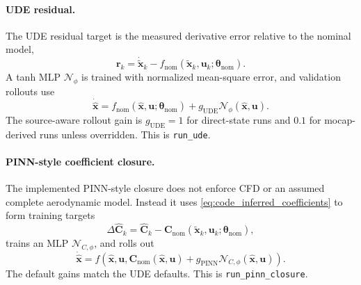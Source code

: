 \documentclass[11pt]{article}
\begin{document}
\paragraph{UDE residual.}
The UDE residual target is the measured derivative error relative to the
nominal model,
\begin{equation}
    \mathbf{r}_k
    =
    \dot{\widetilde{\mathbf{x}}}_k
    -
    f_{\mathrm{nom}}(\widetilde{\mathbf{x}}_k,\mathbf{u}_k;
    \boldsymbol{\theta}_{\mathrm{nom}}).
\end{equation}
A tanh MLP $\mathcal{N}_\phi$ is trained with normalized mean-square error, and
validation rollouts use
\begin{equation}
    \dot{\hat{\mathbf{x}}}
    =
    f_{\mathrm{nom}}(\hat{\mathbf{x}},\mathbf{u};
    \boldsymbol{\theta}_{\mathrm{nom}})
    +g_{\mathrm{UDE}}\mathcal{N}_\phi(\hat{\mathbf{x}},\mathbf{u}).
    \label{eq:code_ude}
\end{equation}
The source-aware rollout gain is $g_{\mathrm{UDE}}=1$ for direct-state runs and
$0.1$ for mocap-derived runs unless overridden. This is \texttt{run\_ude}.

\paragraph{PINN-style coefficient closure.}
The implemented PINN-style closure does not enforce CFD or an assumed complete
aerodynamic model. Instead it uses \eqref{eq:code_inferred_coefficients} to form
training targets
\begin{equation}
    \Delta\widehat{\mathbf{C}}_k
    =
    \widehat{\mathbf{C}}_k
    -
    \mathbf{C}_{\mathrm{nom}}(\widetilde{\mathbf{x}}_k,\mathbf{u}_k;
    \boldsymbol{\theta}_{\mathrm{nom}}),
\end{equation}
trains an MLP $\mathcal{N}_{C,\phi}$, and rolls out
\begin{equation}
    \dot{\hat{\mathbf{x}}}
    =
    f\!\left(
    \hat{\mathbf{x}},\mathbf{u},
    \mathbf{C}_{\mathrm{nom}}(\hat{\mathbf{x}},\mathbf{u})
    +g_{\mathrm{PINN}}\mathcal{N}_{C,\phi}(\hat{\mathbf{x}},\mathbf{u})
    \right).
    \label{eq:code_pinn_closure}
\end{equation}
The default gains match the UDE defaults. This is
\texttt{run\_pinn\_closure}.
\end{document}
